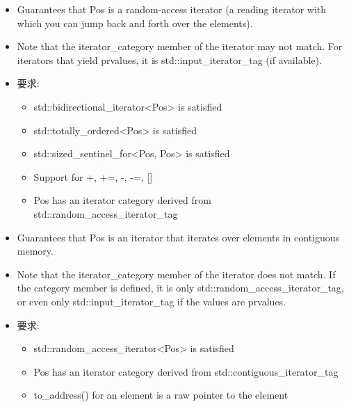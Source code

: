 \begin{itemize}
\item
Guarantees that Pos is a random-access iterator (a reading iterator with which you can jump back and forth over the elements).

\item
Note that the iterator\_category member of the iterator may not match. For iterators that yield prvalues, it is std::input\_iterator\_tag (if available).

\item
要求:
\begin{itemize}
\item
std::bidirectional\_iterator<Pos> is satisfied

\item
std::totally\_ordered<Pos> is satisfied

\item
std::sized\_sentinel\_for<Pos, Pos> is satisfied

\item
Support for +, +=, -, -=, []

\item
Pos has an iterator category derived from std::random\_access\_iterator\_tag
\end{itemize}
\end{itemize}


\begin{itemize}
\item
Guarantees that Pos is an iterator that iterates over elements in contiguous memory.

\item
Note that the iterator\_category member of the iterator does not match. If the category member is defined, it is only std::random\_access\_iterator\_tag, or even only std::input\_iterator\_tag if the values are prvalues.

\item
要求:
\begin{itemize}
\item
std::random\_access\_iterator<Pos> is satisfied

\item
Pos has an iterator category derived from std::contiguous\_iterator\_tag

\item
to\_address() for an element is a raw pointer to the element
\end{itemize}
\end{itemize}

